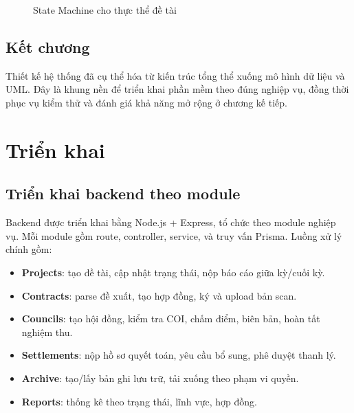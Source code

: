 \documentclass[12pt,a4paper]{report}
\begin{document}
\begin{figure}[H]
\centering
{}
\caption{State Machine cho thực thể đề tài}
\end{figure}

\section{Kết chương}
Thiết kế hệ thống đã cụ thể hóa từ kiến trúc tổng thể xuống mô hình dữ liệu và UML. Đây là khung nền để triển khai phần mềm theo đúng nghiệp vụ, đồng thời phục vụ kiểm thử và đánh giá khả năng mở rộng ở chương kế tiếp.

\chapter{Triển khai}

\section{Triển khai backend theo module}
Backend được triển khai bằng Node.js + Express, tổ chức theo module nghiệp vụ. Mỗi module gồm route, controller, service, và truy vấn Prisma. Luồng xử lý chính gồm:
\begin{itemize}[leftmargin=1.2cm]
\item \textbf{Projects}: tạo đề tài, cập nhật trạng thái, nộp báo cáo giữa kỳ/cuối kỳ.
\item \textbf{Contracts}: parse đề xuất, tạo hợp đồng, ký và upload bản scan.
\item \textbf{Councils}: tạo hội đồng, kiểm tra COI, chấm điểm, biên bản, hoàn tất nghiệm thu.
\item \textbf{Settlements}: nộp hồ sơ quyết toán, yêu cầu bổ sung, phê duyệt thanh lý.
\item \textbf{Archive}: tạo/lấy bản ghi lưu trữ, tải xuống theo phạm vi quyền.
\item \textbf{Reports}: thống kê theo trạng thái, lĩnh vực, hợp đồng.
\end{itemize}
\end{document}
